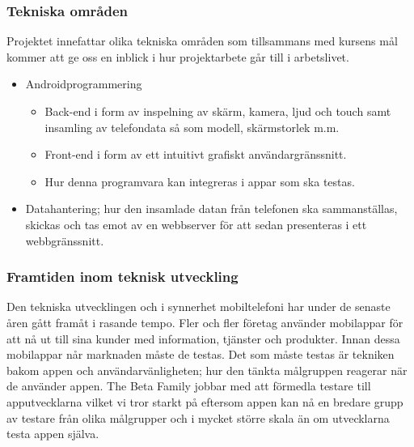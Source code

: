 \subsubsection{Tekniska områden}

Projektet innefattar olika tekniska områden som tillsammans med kursens mål kommer att ge oss en inblick i hur projektarbete går till i arbetslivet. 
\begin{itemize}
	\item Androidprogrammering
	\begin{itemize}
		\item Back-end i form av inspelning av skärm, kamera, ljud och touch samt insamling av telefondata så som modell, skärmstorlek m.m.
		\item Front-end i form av ett intuitivt grafiskt användargränssnitt.
		\item Hur denna programvara kan integreras i appar som ska testas.
	\end{itemize}
	\item Datahantering; hur den insamlade datan från telefonen ska sammanställas, skickas och tas emot av en webbserver för att sedan presenteras i ett webbgränssnitt.
\end{itemize}

\subsubsection{Framtiden inom teknisk utveckling}
Den tekniska utvecklingen och i synnerhet mobiltelefoni har under de senaste åren gått framåt i rasande tempo. Fler och fler företag använder mobilappar för att nå ut till sina kunder med information, tjänster och produkter. Innan dessa mobilappar når marknaden måste de testas. Det som måste testas är tekniken bakom appen och användarvänligheten; hur den tänkta målgruppen reagerar när de använder appen. The Beta Family jobbar med att förmedla testare till apputvecklarna vilket vi tror starkt på eftersom appen kan nå en bredare grupp av testare från olika målgrupper och i mycket större skala än om utvecklarna testa appen själva.
